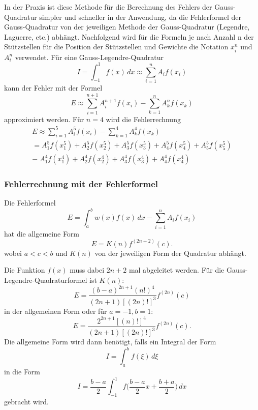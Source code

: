 In der Praxis ist diese Methode für die Berechnung des Fehlers der Gauss-Quadratur
simpler und schneller in der Anwendung, da die Fehlerformel der Gauss-Quadratur
von der jeweiligen Methode der Gauss-Quadratur (Legendre, Laguerre, etc.) abhängt.
Nachfolgend wird für die Formeln je nach Anzahl n der Stützstellen für die
Position der Stützstellen und Gewichte die Notation $x_{i}^{n}$ und $A_{i}^{n}$ verwendet.
Für eine Gauss-Legendre-Quadratur 
\begin{equation}
    I 
    = 
    \int_{-1}^{1}f(x)\,dx 
    \approx 
    \sum_{i=1}^{n}A_{i}f(x_{i})
\end{equation}
kann der Fehler mit der Formel
\begin{equation}
    E 
    \approx 
    \sum_{i=1}^{n+1}A_{i}^{n+1}f(x_{i})
    -
    \sum_{k=1}^{n}A_{k}^{n}f(x_{k})
\end{equation}
approximiert werden. Für $n = 4$ wird die Fehlerrechnung 
\begin{gather*}
    E
    \approx
    \sum_{i=1}^{5}A_{i}^{5}f(x_{i})
    -
    \sum_{k=1}^{4}A_{k}^{4}f(x_{k}) \\
    =
    A_{1}^{5}f(x_{1}^{5})+A_{2}^{5}f(x_{2}^{5})+A_{3}^{5}f(x_{3}^{5})+A_{4}^{5}f(x_{4}^{5})+A_{5}^{5}f(x_{5}^{5}) \\
    -\;
    A_{1}^{4}f(x_{1}^{4})+A_{2}^{4}f(x_{2}^{4})+A_{3}^{4}f(x_{3}^{4})+A_{4}^{4}f(x_{4}^{4})
\end{gather*}

\subsubsection{Fehlerrechnung mit der Fehlerformel}
Die Fehlerformel
\begin{equation}
    E = \int_{a}^{b} w(x) f(x) \, dx - \sum_{i=1}^{n}A_{i}f(x_{i})    
\end{equation} 
hat die allgemeine Form
\begin{equation}
    E = K(n)f^{(2n+2)}(c).
\end{equation}
wobei $a<c<b$ und $K(n)$ von der jeweiligen Form der Quadratur abhängt.

Die Funktion $f(x)$ muss dabei $2n+2$ mal abgeleitet werden.
Für die Gauss-Legendre-Quadraturformel ist $K(n)$:
\begin{equation}
    \label{quadratur:equation:errorformula}
    E = \frac{(b-a)^{2n+1}(n!)^{4}}{(2n+1)[(2n)!]^{3}}f^{(2n)}(c)
\end{equation}
in der allgemeinen Form oder für $a=-1, b=1$:
\begin{equation}
    E = \frac{2^{2n+1}[(n)!]^{4}}{(2n+1)[(2n)!]^{3}}f^{(2n)}(c).
\end{equation}
Die allgemeine Form wird dann benötigt, falls ein Integral der Form 
\begin{equation}
    I = \int_{a}^{b} f(\xi) \,d\xi
\end{equation}
in die Form
\begin{equation}
    I = \frac{b-a}{2} \int_{-1}^{1} f\bigg(\frac{b-a}{2}x + \frac{b+a}{2}\bigg) \,dx
\end{equation}
gebracht wird.

